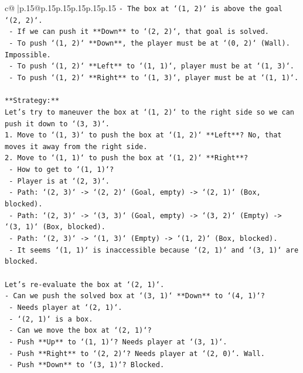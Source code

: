 \documentclass{article}
\begin{document}
{\begin{supertabular}{c@{$\;$}|p{.15\linewidth}@{}p{.15\linewidth}p{.15\linewidth}p{.15\linewidth}p{.15\linewidth}p{.15\linewidth}}
{{{\texttt{{-} The box at `(1, 2)` is above the goal `(2, 2)`.} \\
\texttt{  {-} If we can push it **Down** to `(2, 2)`, that goal is solved.} \\
\texttt{  {-} To push `(1, 2)` **Down**, the player must be at `(0, 2)` (Wall). Impossible.} \\
\texttt{  {-} To push `(1, 2)` **Left** to `(1, 1)`, player must be at `(1, 3)`.} \\
\texttt{  {-} To push `(1, 2)` **Right** to `(1, 3)`, player must be at `(1, 1)`.} \\
\\ 
\texttt{**Strategy:**} \\
\texttt{Let's try to maneuver the box at `(1, 2)` to the right side so we can push it down to `(3, 3)`.} \\
\texttt{1. Move to `(1, 3)` to push the box at `(1, 2)` **Left**? No, that moves it away from the right side.} \\
\texttt{2. Move to `(1, 1)` to push the box at `(1, 2)` **Right**?} \\
\texttt{   {-} How to get to `(1, 1)`?} \\
\texttt{   {-} Player is at `(2, 3)`.} \\
\texttt{   {-} Path: `(2, 3)` {-}> `(2, 2)` (Goal, empty) {-}> `(2, 1)` (Box, blocked).} \\
\texttt{   {-} Path: `(2, 3)` {-}> `(3, 3)` (Goal, empty) {-}> `(3, 2)` (Empty) {-}> `(3, 1)` (Box, blocked).} \\
\texttt{   {-} Path: `(2, 3)` {-}> `(1, 3)` (Empty) {-}> `(1, 2)` (Box, blocked).} \\
\texttt{   {-} It seems `(1, 1)` is inaccessible because `(2, 1)` and `(3, 1)` are blocked.} \\
\\ 
\texttt{Let's re{-}evaluate the box at `(2, 1)`.} \\
\texttt{{-} Can we push the solved box at `(3, 1)` **Down** to `(4, 1)`?} \\
\texttt{  {-} Needs player at `(2, 1)`.} \\
\texttt{  {-} `(2, 1)` is a box.} \\
\texttt{  {-} Can we move the box at `(2, 1)`?} \\
\texttt{    {-} Push **Up** to `(1, 1)`? Needs player at `(3, 1)`.} \\
\texttt{    {-} Push **Right** to `(2, 2)`? Needs player at `(2, 0)`. Wall.} \\
\texttt{    {-} Push **Down** to `(3, 1)`? Blocked.} \\
}}}
\end{supertabular}}
\end{document}

